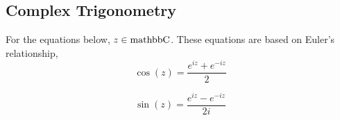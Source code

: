 \subsection{Complex Trigonometry}\label{subsec:Complex_Trigonometry}
For the equations below, $z \in \operatorname{mathbb{C}}$.
These equations are based on Euler's relationship, 
\begin{equation}\label{eq:Complex_Cosine}
  \cos(z) = \frac{e^{iz} + e^{-iz}}{2}
\end{equation}

\begin{equation}\label{eq:Complex_Sine}
  \sin(z) = \frac{e^{iz} - e^{-iz}}{2i}
\end{equation}


